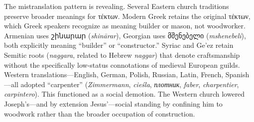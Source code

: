 The mistranslation pattern is revealing.
Several Eastern church traditions preserve broader meanings for τέκτων.
Modern Greek retains the original τέκτων, which Greek speakers recognize as meaning builder or mason, not woodworker.
Armenian uses շինարար (\emph{shinārar}), Georgian uses მშენებელი (\emph{mshenebeli}), both explicitly meaning ``builder'' or ``constructor.''
Syriac and Ge'ez retain Semitic roots (\emph{naggara}, related to Hebrew \emph{naggar}) that denote craftsmanship without the specifically low-status connotations of medieval European guilds.
Western translations---English, German, Polish, Russian, Latin, French, Spanish---all adopted ``carpenter'' (\emph{Zimmermann}, \emph{cieśla}, \emph{плотник}, \emph{faber}, \emph{charpentier}, \emph{carpintero}).
This functioned as a social demotion.
The Western church lowered Joseph's---and by extension Jesus'---social standing by confining him to woodwork rather than the broader occupation of construction.


